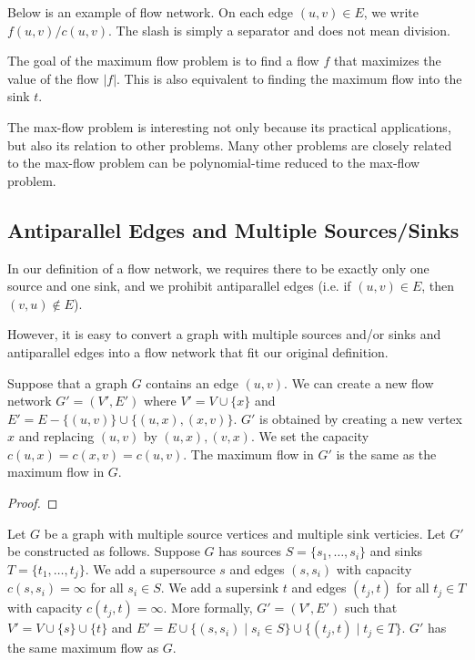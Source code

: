 \begin{example}
    Below is an example of flow network. On each edge $(u,v) \in E$, we write $f(u,v) / c(u,v)$. The slash is simply a separator and does not mean division.

\end{example}

The goal of the maximum flow problem is to find a flow $f$ that maximizes the value of the flow $|f|$. This is also equivalent to finding the maximum flow into the sink $t$.

The max-flow problem is interesting not only because its practical applications, but also its relation to other problems. Many other problems are closely related to the max-flow problem can be polynomial-time reduced to the max-flow problem.

\subsection{Antiparallel Edges and Multiple Sources/Sinks}

In our definition of a flow network, we requires there to be exactly only one source and one sink, and we prohibit antiparallel edges (i.e. if $(u,v) \in E$, then $(v,u) \not\in E$).

However, it is easy to convert a graph with multiple sources and/or sinks and antiparallel edges into a flow network that fit our original definition.

\begin{theorem}
    Suppose that a graph $G$ contains an edge $(u,v)$. We can create a new flow network $G'=(V',E')$ where $V' = V \cup \{x\}$ and $E' = E - \{(u,v)\} \cup \{(u,x),(x,v)\}$. $G'$ is obtained by creating a new vertex $x$ and replacing $(u,v)$ by $(u,x),(v,x)$. We set the capacity $c(u,x) = c(x,v) = c(u,v)$. The maximum flow in $G'$ is the same as the maximum flow in $G$.
\end{theorem}

\begin{proof}
    
\end{proof}

\begin{theorem}
    Let $G$ be a graph with multiple source vertices and multiple sink verticies. Let $G'$ be constructed as follows. Suppose $G$ has sources $S=\{s_1,\ldots,s_i\}$ and sinks $T=\{t_1,\ldots,t_j\}$. We add a supersource $s$ and edges $(s,s_i)$ with capacity $c(s,s_i) = \infty$ for all $s_i \in S$. We add a supersink $t$ and edges $(t_j,t)$ for all $t_j \in T$ with capacity $c(t_j,t) = \infty$. More formally, $G'=(V',E')$ such that $V' = V \cup \{s\} \cup \{t\}$ and $E' = E \cup \{(s,s_i) \mid s_i \in S\} \cup \{(t_j,t) \mid t_j \in T\}$. $G'$ has the same maximum flow as $G$.
\end{theorem}

